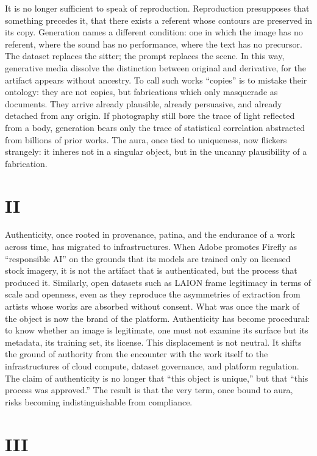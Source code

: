 \documentclass[12pt]{article}
\begin{document}
It is no longer sufficient to speak of reproduction. Reproduction presupposes that something precedes it, that there exists a referent whose contours are preserved in its copy. Generation names a different condition: one in which the image has no referent, where the sound has no performance, where the text has no precursor. The dataset replaces the sitter; the prompt replaces the scene. In this way, generative media dissolve the distinction between original and derivative, for the artifact appears without ancestry. To call such works “copies” is to mistake their ontology: they are not copies, but fabrications which only masquerade as documents. They arrive already plausible, already persuasive, and already detached from any origin. If photography still bore the trace of light reflected from a body, generation bears only the trace of statistical correlation abstracted from billions of prior works.\autocite{Pasquinelli2023} The aura, once tied to uniqueness, now flickers strangely: it inheres not in a singular object, but in the uncanny plausibility of a fabrication.

\section*{II}

Authenticity, once rooted in provenance, patina, and the endurance of a work across time, has migrated to infrastructures. When Adobe promotes Firefly as “responsible AI” on the grounds that its models are trained only on licensed stock imagery,\autocite{Adobe2023} it is not the artifact that is authenticated, but the process that produced it. Similarly, open datasets such as LAION frame legitimacy in terms of scale and openness, even as they reproduce the asymmetries of extraction from artists whose works are absorbed without consent.\autocite{Schuhmann2022} What was once the mark of the object is now the brand of the platform. Authenticity has become procedural: to know whether an image is legitimate, one must not examine its surface but its metadata, its training set, its license. This displacement is not neutral. It shifts the ground of authority from the encounter with the work itself to the infrastructures of cloud compute, dataset governance, and platform regulation. The claim of authenticity is no longer that “this object is unique,” but that “this process was approved.” The result is that the very term, once bound to aura, risks becoming indistinguishable from compliance.

\section*{III}
\end{document}
